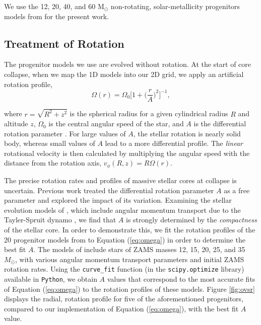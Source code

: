 \documentclass[twocolumn,times]{aastex62}  %
\newcommand{\Msun}{\ensuremath{\mathrm{M}_\odot}\xspace}
\begin{document}
We use the 12, 20, 40, and 60 \Msun non-rotating, solar-metallicity progenitors models from \citet{Suk:2016} for the present work.

\subsection{Treatment of Rotation}




The progenitor models we use are evolved without rotation.
At the start of core collapse, when we map the 1D models into our 2D grid, we apply an artificial rotation profile,
\begin{equation}
    \Omega(r) = \Omega_0 \bigg[1 + \bigg(\frac{r}{A}\bigg)^2 \bigg]^{-1}, 
    \label{eq:omega}
\end{equation}

where $r = \sqrt{R^2 + z^2}$ is the spherical radius for a given cylindrical radius $R$ and altitude $z$, $\Omega_0$ is the central angular speed of the star, and $A$ is the differential rotation parameter \citep{eriguchi:1984}.  For large values of $A$, the stellar rotation is nearly solid body, whereas small values of $A$ lead to a more differential profile. 
The {\it linear} rotational velocity is then calculated by multiplying the angular speed with the distance from the rotation axis, $v_\phi (R, z) = R \Omega (r) $. 

The precise rotation rates and profiles of massive stellar cores at collapse is uncertain.
Previous work \citep[e.g.,][]{abdik:2014} treated the differential rotation parameter $A$ as a free parameter and explored the impact of its variation.
Examining the stellar evolution models of \citet{heger:2005}, which include angular momentum transport due to the Tayler-Spruit dynamo \citep{spruit:2002}, we find that $A$ is strongly determined by the {\it compactness} \citep{oconnor:2011} of the stellar core.
In order to demonstrate this, we fit the rotation profiles of the 20 progenitor models from \citet{heger:2005} to Equation (\ref{eq:omega}) in order to determine the best fit $A$.
The models of \citet{heger:2005} include stars of ZAMS masses 12, 15, 20, 25, and 35 $M_{\odot}$, with various angular momentum transport parameters and initial ZAMS rotation rates.  
Using the \texttt{curve\_fit} function (in the \texttt{scipy.optimize} library) available in \texttt{Python}, we obtain $A$ values that correspond to the most accurate fits of Equation (\ref{eq:omega}) to the rotation profiles of these models.  Figure \ref{fig:ovsr} displays the radial, rotation profile for five of the aforementioned progenitors, compared to our implementation of Equation (\ref{eq:omega}), with the best fit $A$ value.
\end{document}
